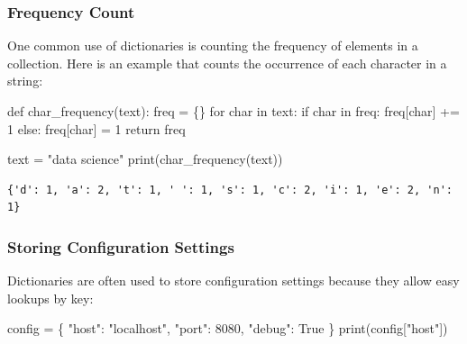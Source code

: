 \documentclass[
  letterpaper,
  DIV=11,
  numbers=noendperiod]{scrreprt}
\newenvironment{Shaded}{\begin{snugshade}}{\end{snugshade}}
\newcommand{\BuiltInTok}[1]{\textcolor[rgb]{0.00,0.23,0.31}{#1}}
\newcommand{\ControlFlowTok}[1]{\textcolor[rgb]{0.00,0.23,0.31}{#1}}
\newcommand{\DecValTok}[1]{\textcolor[rgb]{0.68,0.00,0.00}{#1}}
\newcommand{\KeywordTok}[1]{\textcolor[rgb]{0.00,0.23,0.31}{#1}}
\newcommand{\NormalTok}[1]{\textcolor[rgb]{0.00,0.23,0.31}{#1}}
\newcommand{\OperatorTok}[1]{\textcolor[rgb]{0.37,0.37,0.37}{#1}}
\newcommand{\StringTok}[1]{\textcolor[rgb]{0.13,0.47,0.30}{#1}}
\newcommand{\VariableTok}[1]{\textcolor[rgb]{0.07,0.07,0.07}{#1}}
\begin{document}
\hypertarget{frequency-count}{%
\subsubsection{Frequency Count}\label{frequency-count}}

One common use of dictionaries is counting the frequency of elements in
a collection. Here is an example that counts the occurrence of each
character in a string:

\begin{Shaded}
\begin{Highlighting}[]
\KeywordTok{def}\NormalTok{ char\_frequency(text):}
\NormalTok{    freq }\OperatorTok{=}\NormalTok{ \{\}}
    \ControlFlowTok{for}\NormalTok{ char }\KeywordTok{in}\NormalTok{ text:}
        \ControlFlowTok{if}\NormalTok{ char }\KeywordTok{in}\NormalTok{ freq:}
\NormalTok{            freq[char] }\OperatorTok{+=} \DecValTok{1}
        \ControlFlowTok{else}\NormalTok{:}
\NormalTok{            freq[char] }\OperatorTok{=} \DecValTok{1}
    \ControlFlowTok{return}\NormalTok{ freq}

\NormalTok{text }\OperatorTok{=} \StringTok{"data science"}
\BuiltInTok{print}\NormalTok{(char\_frequency(text))}
\end{Highlighting}
\end{Shaded}

\begin{verbatim}
{'d': 1, 'a': 2, 't': 1, ' ': 1, 's': 1, 'c': 2, 'i': 1, 'e': 2, 'n': 1}
\end{verbatim}

\hypertarget{storing-configuration-settings}{%
\subsubsection{Storing Configuration
Settings}\label{storing-configuration-settings}}

Dictionaries are often used to store configuration settings because they
allow easy lookups by key:

\begin{Shaded}
\begin{Highlighting}[]
\NormalTok{config }\OperatorTok{=}\NormalTok{ \{}
    \StringTok{"host"}\NormalTok{: }\StringTok{"localhost"}\NormalTok{,}
    \StringTok{"port"}\NormalTok{: }\DecValTok{8080}\NormalTok{,}
    \StringTok{"debug"}\NormalTok{: }\VariableTok{True}
\NormalTok{\}}
\BuiltInTok{print}\NormalTok{(config[}\StringTok{"host"}\NormalTok{])}
\end{Highlighting}
\end{Shaded}
\end{document}
